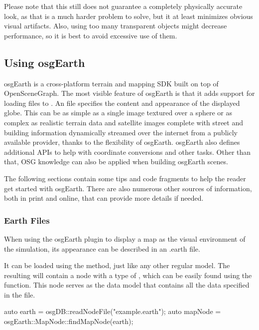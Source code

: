Please note that this still does not guarantee a completely physically accurate
look, as that is a much harder problem to solve, but it at least minimizes
obvious visual artifacts. Also, using too many transparent objects might
decrease performance, so it is best to avoid excessive use of them.

\subsection{Using osgEarth}
\label{sec:graphics:using-osgearth}

osgEarth is a cross-platform terrain and mapping SDK built on top of
OpenSceneGraph. The most visible feature of osgEarth is that it adds support for
loading  files to . An  file
specifies the content and appearance of the displayed globe. This can be as
simple as a single image textured over a sphere or as complex as realistic
terrain data and satellite images complete with street and building information
dynamically streamed over the internet from a publicly available provider,
thanks to the flexibility of osgEarth. osgEarth also defines additional APIs to
help with coordinate conversions and other tasks. Other than that, OSG knowledge
can also be applied when building osgEarth scenes.

The following sections contain some tips and code fragments to help the reader
get started with osgEarth. There are also numerous other sources of information,
both in print and online, that can provide more details if needed.

\subsubsection{Earth Files}
\label{sec:graphics:earth-files}

When using the osgEarth plugin to display a map as the visual environment of the
simulation, its appearance can be described in an .earth file.

It can be loaded using the  method, just like any
other regular model. The resulting  will contain a node with a
type of , which can be easily found using the
 function. This node serves as the data
model that contains all the data specified in the  file.

\begin{cpp}
auto earth = osgDB::readNodeFile("example.earth");
auto mapNode = osgEarth::MapNode::findMapNode(earth);
\end{cpp}


